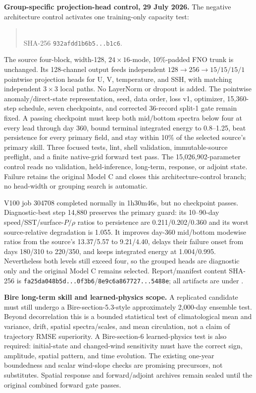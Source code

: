 \documentclass[11pt]{article}
\begin{document}
\textbf{Group-specific projection-head control, 29 July 2026.}  The negative
architecture control activates one training-only capacity test:
\begin{quote}
\\
SHA-256 \texttt{932afdd1b6b5...b1c6}.
\end{quote}
The source four-block, width-128, \(24\times16\)-mode, 10\%-padded FNO
trunk is unchanged.  Its 128-channel output feeds independent
\(128\rightarrow256\rightarrow15/15/15/1\) pointwise projection heads for
U, V, temperature, and SSH, with matching independent \(3\times3\) local
paths.  No LayerNorm or dropout is added.  The pointwise anomaly/direct-state
representation, seed, data order, loss v1, optimizer, 15,360-step schedule,
seven checkpoints, and corrected 36-record split-1 gate remain fixed.  A
passing checkpoint must keep both mid/bottom spectra below four at every lead
through day 360, bound terminal integrated energy to 0.8--1.25, beat
persistence for every primary field, and stay within 10\% of the selected
source's primary skill.  Three focused tests, lint, shell validation,
immutable-source preflight, and a finite native-grid forward test pass.  The
15,026,902-parameter control reads no validation, held-inference, long-term,
response, or adjoint state.  Failure retains the original Model C and closes
this architecture-control branch; no head-width or grouping search is
automatic.

V100 job 304708 completed normally in 1h30m46s, but no checkpoint passes.
Diagnostic-best step 14,880 preserves the primary guard: its 10--90-day
speed/SST/surface-\(P/\rho\) ratios to persistence are
0.211/0.202/0.360 and its worst source-relative degradation is 1.055.
It improves day-360 mid/bottom modewise ratios from the source's
13.37/5.57 to 9.21/4.40, delays their failure onset from days 180/310 to
220/350, and keeps integrated energy at 1.004/0.995.  Nevertheless both
levels still exceed four, so the grouped heads are diagnostic only and the
original Model C remains selected.  Report/manifest content SHA-256 is
\texttt{fa25da048b5d...0f3b6}/\texttt{8e9c6a867727...5488e}; all artifacts
are under
.

\textbf{Bire long-term skill and learned-physics scope.}  A replicated
candidate must still undergo a Bire-section-5.3-style approximately 2,000-day
ensemble test.  Beyond decorrelation this is a bounded statistical test of
climatological mean and variance, drift, spatial spectra/scales, and mean
circulation, not a claim of trajectory RMSE superiority.  A Bire-section-6
learned-physics test is also required: initial-state and changed-wind
sensitivity must have the correct sign, amplitude, spatial pattern, and time
evolution.  The existing one-year boundedness and scalar wind-slope checks are
promising precursors, not substitutes.  Spatial response and forward/adjoint
archives remain sealed until the original combined forward gate passes.
\end{document}
